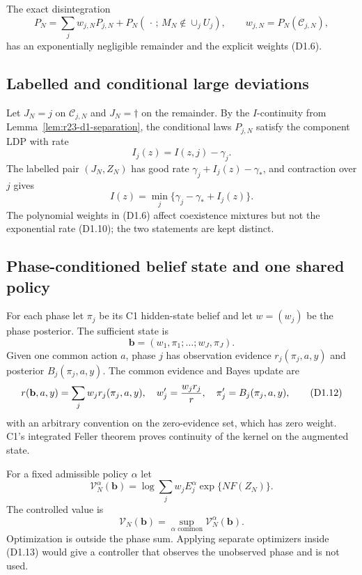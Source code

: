 The exact disintegration
\[
 P_N=\sum_jw_{j,N}P_{j,N}+P_N(\,\cdot\,;\,M_N\notin\cup_jU_j),
 \qquad
 w_{j,N}=P_N(\mathcal C_{j,N}),                           \tag{D1.8}
\]
has an exponentially negligible remainder and the explicit weights (D1.6).

\subsection{Labelled and conditional large deviations}

Let $J_N=j$ on $\mathcal C_{j,N}$ and $J_N=\dagger$ on the remainder.  By the
$I$-continuity from Lemma~\ref{lem:r23-d1-separation}, the conditional laws
$P_{j,N}$ satisfy the component LDP with rate
\[
 I_j(z)=I(z,j)-\gamma_j.                                 \tag{D1.9}
\]
The labelled pair $(J_N,Z_N)$ has good rate
$\gamma_j+I_j(z)-\gamma_*$, and contraction over $j$ gives
\[
 I(z)=\min_j\{\gamma_j-\gamma_*+I_j(z)\}.                \tag{D1.10}
\]
The polynomial weights in (D1.6) affect coexistence mixtures but not the
exponential rate (D1.10); the two statements are kept distinct.

\subsection{Phase-conditioned belief state and one shared policy}

For each phase let $\pi_j$ be its C1 hidden-state belief and let
$w=(w_j)$ be the phase posterior.  The sufficient state is
\[
 \mathbf b=(w_1,\pi_1;\ldots;w_J,\pi_J).                 \tag{D1.11}
\]
Given one common action $a$, phase $j$ has observation evidence
$r_j(\pi_j,a,y)$ and posterior $B_j(\pi_j,a,y)$.  The common evidence and
Bayes update are
\[
 r(\mathbf b,a,y)=\sum_jw_jr_j(\pi_j,a,y),
 \quad
 w_j'={w_jr_j\over r},
 \quad
 \pi_j'=B_j(\pi_j,a,y),                                  \tag{D1.12}
\]
with an arbitrary convention on the zero-evidence set, which has zero weight.
C1's integrated Feller theorem proves continuity of the kernel on the
augmented state.

For a fixed admissible policy $\alpha$ let
\[
 \mathcal V_N^\alpha(\mathbf b)
 =\log\sum_jw_jE_{j}^{\alpha}
       \exp\{N F(Z_N)\}.                                 \tag{D1.13}
\]
The controlled value is
\[
 \mathcal V_N(\mathbf b)=\sup_{\alpha\text{ common}}
 \mathcal V_N^\alpha(\mathbf b).                         \tag{D1.14}
\]
Optimization is outside the phase sum.  Applying separate optimizers inside
(D1.13) would give a controller that observes the unobserved phase and is not
used.

